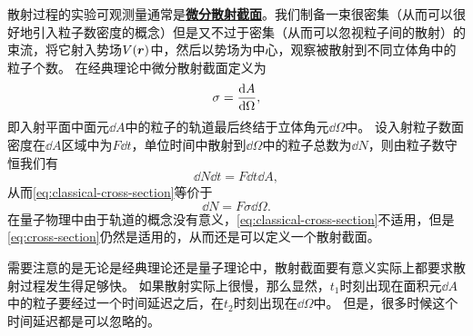 \documentclass[UTF8, a4paper]{ctexart}
\newcommand{\concept}[1]{\underline{\textbf{#1}}}
\begin{document}
散射过程的实验可观测量通常是\concept{微分散射截面}。我们制备一束很密集（从而可以很好地引入粒子数密度的概念）但是又不过于密集（从而可以忽视粒子间的散射）的束流，将它射入势场$V(\vb*{r})$中，然后以势场为中心，观察被散射到不同立体角中的粒子个数。
在经典理论中微分散射截面定义为
\begin{equation}
    \sigma = \dv{A}{\Omega},
    \label{eq:classical-cross-section}
\end{equation}
即入射平面中面元$\dd{A}$中的粒子的轨道最后终结于立体角元$\dd{\Omega}$中。
设入射粒子数面密度在$\dd{A}$区域中为$F \dd{t}$，单位时间中散射到$\dd{\Omega}$中的粒子总数为$\dd{N}$，则由粒子数守恒我们有
\[
    \dd{N} \dd{t} = F \dd{t} \dd{A},
\]
从而\eqref{eq:classical-cross-section}等价于
\begin{equation}
    \dd{N} = F \sigma \dd{\Omega}.
    \label{eq:cross-section}
\end{equation}
在量子物理中由于轨道的概念没有意义，\eqref{eq:classical-cross-section}不适用，但是\eqref{eq:cross-section}仍然是适用的，从而还是可以定义一个散射截面。

需要注意的是无论是经典理论还是量子理论中，散射截面要有意义实际上都要求散射过程发生得足够快。
如果散射实际上很慢，那么显然，$t_1$时刻出现在面积元$\dd{A}$中的粒子要经过一个时间延迟之后，在$t_2$时刻出现在$\dd{\Omega}$中。
但是，很多时候这个时间延迟都是可以忽略的。
\end{document}
